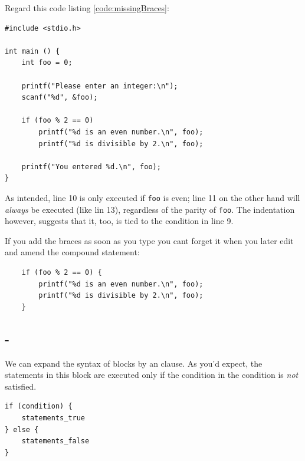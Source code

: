 Regard this code listing \ref{code:missingBraces}:
\begin{warnbox}[missingBraces.c, leftupper=7mm]
\begin{verbatim}
#include <stdio.h>

int main () {
    int foo = 0;

    printf("Please enter an integer:\n");
    scanf("%d", &foo);

    if (foo % 2 == 0)
        printf("%d is an even number.\n", foo);
        printf("%d is divisible by 2.\n", foo);

    printf("You entered %d.\n", foo);
}
\end{verbatim}
 \label{code:missingBraces}
\end{warnbox}

As intended, line 10 is only executed if \texttt{foo} is even; line 11 on the other hand will \emph{always} be executed (like lin 13), regardless of the parity of \texttt{foo}. The indentation however, suggests that it, too, is tied to the condition in line 9.

If you add the braces as soon as you type  you cant forget it when you later edit and amend the compound statement:
\begin{codebox}[correctedBraces.c]
\begin{verbatim}
    if (foo % 2 == 0) {
        printf("%d is an even number.\n", foo);
        printf("%d is divisible by 2.\n", foo);
    }
\end{verbatim}
\end{codebox}



\subsection{-}
We can expand the syntax of  blocks by an  clause. As you'd expect, the statements in this block are executed only if the condition in the  condition is \emph{not} satisfied.

\begin{codebox}
\begin{verbatim}
if (condition) {
    statements_true
} else {
    statements_false
}
\end{verbatim}
\end{codebox}

